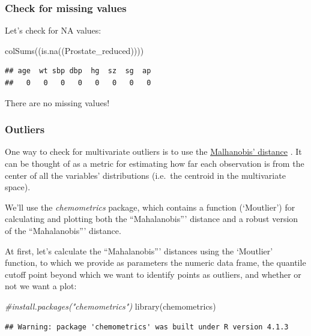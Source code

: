 \documentclass[
]{article}
\newenvironment{Shaded}{\begin{snugshade}}{\end{snugshade}}
\newcommand{\CommentTok}[1]{\textcolor[rgb]{0.56,0.35,0.01}{\textit{#1}}}
\newcommand{\FunctionTok}[1]{\textcolor[rgb]{0.00,0.00,0.00}{#1}}
\newcommand{\NormalTok}[1]{#1}
\begin{document}
\hypertarget{check-for-missing-values}{%
\subsubsection{Check for missing
values}\label{check-for-missing-values}}

Let's check for NA values:

\begin{Shaded}
\begin{Highlighting}[]
\FunctionTok{colSums}\NormalTok{((}\FunctionTok{is.na}\NormalTok{((Prostate\_reduced))))}
\end{Highlighting}
\end{Shaded}

\begin{verbatim}
## age  wt sbp dbp  hg  sz  sg  ap 
##   0   0   0   0   0   0   0   0
\end{verbatim}

There are no missing values!

\hypertarget{outliers}{%
\subsubsection{Outliers}\label{outliers}}

One way to check for multivariate outliers is to use the
\href{https://en.wikipedia.org/wiki/Mahalanobis_distance}{Malhanobis'
distance} . It can be thought of as a metric for estimating how far each
observation is from the center of all the variables' distributions
(i.e.~the centroid in the multivariate space).

We'll use the \emph{chemometrics} package, which contains a function
(`Moutlier') for calculating and plotting both the ``Mahalanobis'''
distance and a robust version of the ``Mahalanobis''' distance.

At first, let's calculate the ``Mahalanobis''' distances using the
`Moutlier' function, to which we provide as parameters the numeric data
frame, the quantile cutoff point beyond which we want to identify points
as outliers, and whether or not we want a plot:

\begin{Shaded}
\begin{Highlighting}[]
\CommentTok{\#install.packages("chemometrics")}
\FunctionTok{library}\NormalTok{(chemometrics)}
\end{Highlighting}
\end{Shaded}

\begin{verbatim}
## Warning: package 'chemometrics' was built under R version 4.1.3
\end{verbatim}
\end{document}
